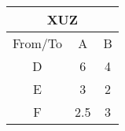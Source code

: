 \begin{center}
\begin{tabular}{|c|c|c|}
\hline
\multicolumn{3}{|c|}{XUZ} \\ \hline
From/To	&A	&B\\ \hline
D	&6	&4\\ \hline
E	&3	&2\\ \hline
F	&2.5	&3
\\ \hline
\end{tabular}
\end{center}

